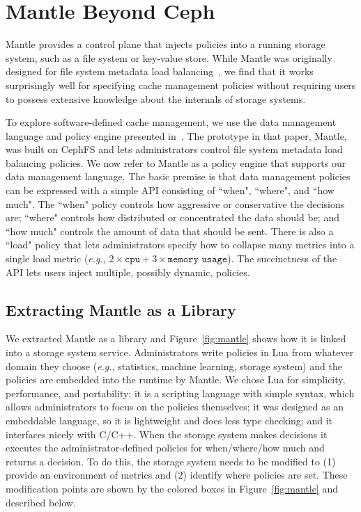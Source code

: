 \chapter{Mantle Beyond Ceph}
\label{chp:mantle-beyond}

Mantle provides a control plane that injects policies into a running
storage system, such as a file system or key-value store. While Mantle was
originally designed for file system metadata load
balancing~\cite{sevilla:sc15-mantle}, we find that it works surprisingly well
for specifying cache management policies without requiring users to possess
extensive knowledge about the internals of storage systems. 

To explore software-defined cache management, we use the data management
language and policy engine presented in~\cite{sevilla:sc15-mantle}. The
prototype in that paper, Mantle, was built on CephFS and lets administrators
control file system metadata load balancing policies.  We now refer to Mantle
as a policy engine that supports our data management language.  The basic
premise is that data management policies can be expressed with a simple API
consisting of ``when", ``where", and ``how much". The ``when" policy controls
how aggressive or conservative the decisions are; ``where" controls how
distributed or concentrated the data should be; and ``how much" controls the
amount of data that should be sent. There is also a ``load" policy that lets
administrators specify how to collapse many metrics into a single load metric
({\it e.g.}, \(2\times\texttt{cpu} + 3\times\texttt{memory usage}\)).
The succinctness of the API lets users inject multiple, possibly dynamic, policies. 

\section{Extracting Mantle as a Library}
\label{sec:extracting}

We extracted Mantle as a library and Figure~\ref{fig:mantle} shows how it is
linked into a storage system service.  Administrators write policies in Lua from whatever
domain they choose ({\it e.g.}, statistics, machine learning, storage system)
and the policies are embedded into the runtime by Mantle.  We chose Lua for
simplicity, performance, and portability; it is a scripting language with
simple syntax, which allows administrators to focus on the policies themselves;
it was designed as an embeddable language, so it is lightweight and does less
type checking; and it interfaces nicely with C/C++.  When the storage system makes
decisions it executes the administrator-defined policies for when/where/how
much and returns a decision.  To do this, the storage system needs to be modified to
(1) provide an environment of metrics and (2) identify where policies are set.
These modification points are shown by the colored boxes in
Figure~\ref{fig:mantle} and described below.

